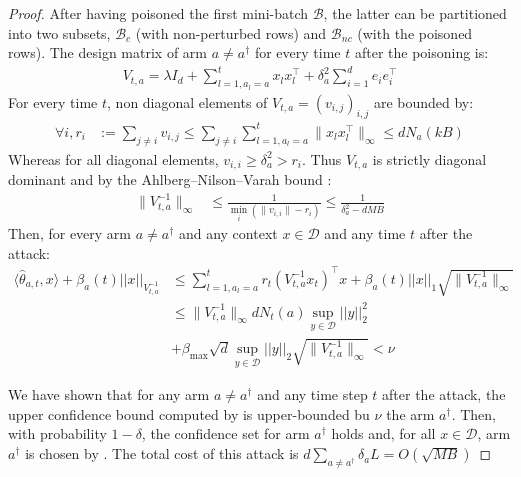 \begin{proof}
After having poisoned the first mini-batch $\mathcal{B}$, the latter can be partitioned into two subsets, $\mathcal{B}_{c}$ (with non-perturbed rows) and $\mathcal{B}_{nc}$ (with the poisoned rows). The design matrix of arm $a\neq a^{\dagger}$ for every time $t$ after the poisoning is:
\begin{align}
    V_{t,a} = \lambda I_d +  \sum_{l=1, a_{l} = a}^{t} x_{l}x_{l}^{\intercal} + \delta_{a}^2 \sum_{i=1}^{d} e_i e_i^{\intercal}
\end{align}
For every time $t$, non diagonal elements of $V_{t,a} = (v_{i,j})_{i,j}$ are bounded by: 
\begin{align}\label{non_diagonal_element}
    \forall i, r_i &:= \sum_{j \neq i} v_{i,j}\leq \sum_{j \neq i} \sum_{l=1, a_{l} = a}^{t} \lVert x_l x_{l}^{\intercal}\rVert_\infty\leq dN_{a}(kB)
\end{align}
Whereas for all diagonal elements, $v_{i,i} \geq \delta_{a}^2 > r_i$. Thus $V_{t,a}$ is strictly diagonal dominant and by the Ahlberg–Nilson–Varah bound \cite{varah1975lower}:
\begin{align}\label{eq:bound_norm_design_matrix}
\lVert V_{t,a}^{-1} \rVert_\infty &\leq \frac{1}{\min_{i} \left(\lVert v_{i,i}\rVert - r_i\right)} \leq \frac{1}{\delta_{a}^{2} - dMB}
\end{align}
Then, for every arm $a \neq a^{\dagger}$ and any context $x\in \mathcal{D}$ and any time $t$ after the attack:
\begin{align*}
    \langle\hat{\theta}_{a,t}, x\rangle + \beta_{a}(t) ||x||_{V_{t,a}^{-1}} & \leq  \sum_{l=1, a_{l} = a}^{t} r_t (V_{t,a}^{-1} x_t)^{\intercal} x + \beta_{a}(t)||x||_{1}\sqrt{\lVert V_{t,a}^{-1} \rVert_\infty}\\
    & \leq  \lVert V_{t,a}^{-1} \rVert_\infty dN_{t}(a) \sup_{y\in\mathcal{D}} ||y||_{2}^{2} \\
    &+ \beta_{\text{max}}\sqrt{d}\sup_{y\in\mathcal{D}} ||y||_{2}\sqrt{\lVert V_{t,a}^{-1} \rVert_\infty} < \nu
\end{align*}

    
We have shown that for any arm $a \neq a^{\dagger}$ and any time step $t$ after the attack, the upper confidence bound computed by \linucb is upper-bounded bu $\nu$ the arm $a^{\dagger}$. Then, with probability $1-\delta$, the confidence set for arm $a^{\dagger}$ holds and, for all $x \in \mathcal{D}$, arm $a^{\dagger}$ is chosen by \linucb. The total cost of this attack is $d \sum_{a\neq a^{\dagger}} \delta_{a} L = O(\sqrt{MB})$
\end{proof}




